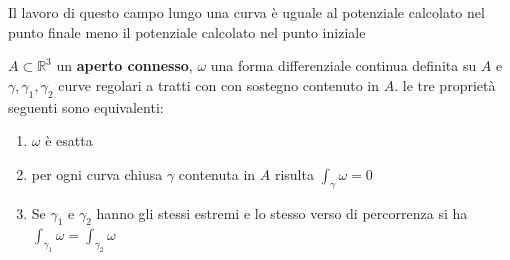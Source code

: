 \documentclass[a4paper, oneside]{article}
\begin{document}
    Il lavoro di questo campo lungo una curva è uguale al potenziale calcolato nel punto finale meno il potenziale calcolato nel punto iniziale
\begin{theorem}
     $A \subset \mathbb{R}^3$ un \textbf{aperto connesso}, $\omega$ una forma differenziale continua definita su $A$ e $\gamma,\gamma_1,\gamma_2$ curve regolari a tratti con con sostegno contenuto in $A$. le tre proprietà seguenti sono equivalenti:
    \begin{enumerate}
        \item $\omega$ è esatta
        \item per ogni curva chiusa $\gamma$ contenuta in $A$ risulta $\int_{\gamma} \omega = 0$
        \item Se $\gamma_1$ e $\gamma_2$ hanno gli stessi estremi e lo stesso verso di percorrenza si ha $\int_{\gamma_1} \omega = \int_{\gamma_2} \omega$
    \end{enumerate} 
\end{theorem}
\end{document}
